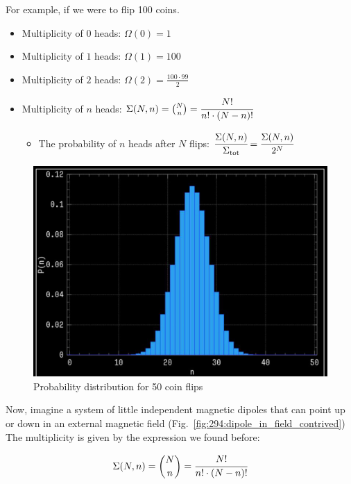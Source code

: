 \documentclass[10pt]{article}
\begin{document}
For example, if we were to flip 100 coins. 

\begin{itemize}
	\item Multiplicity of $ 0 $ heads: $ \Omega(0) =1$ 
	\item Multiplicity of $ 1 $ heads: $ \Omega(1) =100$ 
	\item Multiplicity of $ 2 $ heads: $ \Omega(2) = \frac{100\cdot 99}{2} $ 
	\item Multiplicity of $ n $  heads: $ \Sigma(N, n) = \binom{N}{n} = \cfrac{N!}{n! \cdot (N-n)!} $ 
		\begin{itemize}
			\item The probability of $ n $  heads after $ N $  flips: $ \cfrac{\Sigma(N, n)}{\Sigma_{\text{tot}}} = \cfrac{\Sigma(N, n)}{2^N} $ 
		\end{itemize}
\end{itemize}



\begin{figure}[H]
	\centering
	\includegraphics[width=0.8\linewidth]{img/294_50coins.png}
	\caption{Probability distribution for 50 coin flips}
	\label{fig:294:50_coin-prob_dist}
\end{figure}

Now, imagine a system of little independent magnetic dipoles that can point up or down in an external magnetic field (Fig.~\ref{fig:294:dipole_in_field_contrived})
The multiplicity is given by the expression we found before:

\begin{equation}
	 \Sigma(N, n) = \binom{N}{n} = \cfrac{N!}{n! \cdot (N-n)!} 
\end{equation}
\end{document}
